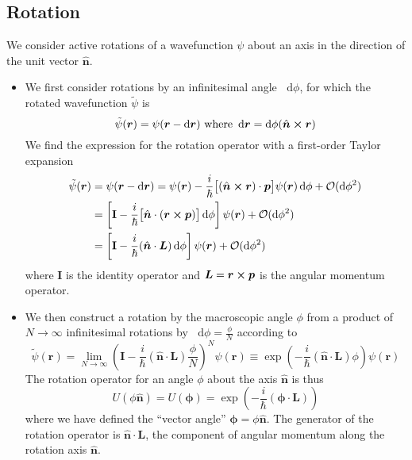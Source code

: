 \documentclass[11pt, a4paper]{article}
\newcommand{\diff}{\mathop{}\!\mathrm{d}} %
\renewcommand{\vec}[1]{\bm{#1}}  %
\newcommand{\mat}[1]{\mathbf{#1}}  %
\newcommand{\uvec}[1]{\hat{\vec{#1}}}  %
\renewcommand{\t}[1]{\tilde{#1}}
\renewcommand{\r}{\vec{r}}  %
\newcommand{\p}{\psi}  %
\begin{document}
\subsection{Rotation}
We consider active rotations of a wavefunction $ \psi $ about an axis in the direction of the unit vector $ \uvec{n} $. 
\begin{itemize}
	\item We first consider rotations by an infinitesimal angle $ \diff \phi $, for which the rotated wavefunction $ \t{\p} $ is
	\begin{equation*}
		\t{\p}(\r) = \p(\r - \diff \r) \ \text{where } \diff \r = \diff \phi (\uvec{n} \cross \r)
	\end{equation*}
	We find the expression for the rotation operator with a first-order Taylor expansion
	\begin{align*}
		\t{\p}(\r) &= \p(\r - \diff \r) = \p(\r) - \frac{i}{\hbar}\big[(\uvec{n}\cross \r) \cdot \vec{p}\big]\p(\r)\diff \phi + \mathcal{O} (\diff \phi^{2})\\
		& = \left[\mat{I} - \frac{i}{\hbar}\big[\uvec{n}\cdot (\r \cross \vec{p})\big]\diff \phi\right] \p(\r)  + \mathcal{O} (\diff \phi^{2})\\
		& = \left[\mat{I} - \frac{i}{\hbar}(\uvec{n}\cdot \vec{L})\diff \phi\right] \p(\r) + \mathcal{O} (\diff \phi^{2})
	\end{align*}
	where $ \mat{I} $ is the identity operator and $ \vec{L} = \r \cross \vec{p} $ is the angular momentum operator. 
	
	\item We then construct a rotation by the macroscopic angle $ \phi $ from a product of $ N \to \infty $ infinitesimal rotations by $ \diff \phi = \frac{\phi}{N} $ according to 
	\begin{equation*}
		\tilde{\p}(\r) = \lim_{N \to \infty} \left(\mat{I} - \frac{i}{\hbar}(\uvec{n}\cdot \vec{L})  \frac{\phi}{N} \right)^{N}\p(\r) \equiv \exp(- \frac{i}{\hbar}(\uvec{n}\cdot \vec{L})\phi) \p(\r)
	\end{equation*}
	The rotation operator for an angle $ \phi $ about the axis $ \uvec{n} $ is thus
	\begin{equation*}
		U(\phi \uvec{n}) = U(\vec{\phi}) = \exp(- \frac{i}{\hbar}(\vec{\phi}\cdot \vec{L})) 
	\end{equation*}
	where we have defined the ``vector angle'' $ \vec{\phi} = \phi \uvec{n} $. The generator of the rotation operator is $ \uvec{n} \cdot \vec{L} $, the component of angular momentum along the rotation axis $ \uvec{n} $. 
	

\end{itemize}
\end{document}
